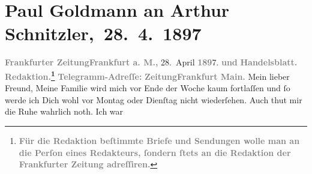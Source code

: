 

         
         \renewcommand{\erwaehntePersonen}{Personen:  ?? [blonder junger Musiker in Paris], Paul Goldmann, Marie Reinhard, Dora Villé}
         \renewcommand{\erwaehnteInstitutionen}{Institutionen: Frankfurter Zeitung}
         \renewcommand{\erwaehnteOrte}{Orte: Berlin, Concert Parisien, Frankfurt am Main, Hotel Deutscher Kaiser, Hôtel de Ville, Panthéon, Paris}
         \renewcommand{\erwaehnteWerke}{}
               \section[ Paul Goldmann an Arthur Schnitzler, 28. 4. 1897]{ Paul Goldmann an Arthur Schnitzler, 28. 4. 1897}\nopagebreak{}\rehead{ }\begin{ledgroupsized}[t]{13cm}\normalsize\beginnumbering \toendnotes[C]{\smallbreak\pagebreak[2]} 
\toendnotes[C]{\smallbreak}\pstart
           \noindent{}{\pb}\textcolor{gray}{\textbf{Frankfurter Zeitung}}\hfill \textcolor{gray}{\textbf{Frankfurt a. M.,}}{ }28. April \textcolor{gray}{\textbf{189}}7.\pend
           \pstart
           \textcolor{gray}{\textbf{und}}\pend
           \pstart
           \textcolor{gray}{\textbf{Handelsblatt.}}\pend
           \pstart
           \textcolor{gray}{\textbf{Redaktion.\footnote{\noindent{}\textcolor{gray}{\textbf{Für die Redaktion beſtimmte Briefe und Sendungen wolle man
                                  an die Perſon eines Redakteurs,
                              ſondern ſtets \textbf{an die Redaktion der Frankfurter Zeitung} adreſſiren.}}}}}\pend
           \pstart
           \textcolor{gray}{\textbf{Telegramm-Adreſſe:}}\pend
           \pstart
           \textcolor{gray}{\textbf{ZeitungFrankfurt Main. }}\pend
           \pstart\center{}Mein lieber Freund,\pend\pstart
           Meine Familie wird mich vor Ende der Woche kaum fortlaſſen und ſo werde ich Dich wohl
               vor Montag oder Dienſtag nicht wiederſehen. Auch thut mir die Ruhe wahrlich noth. Ich war

\end{ledgroupsized}
